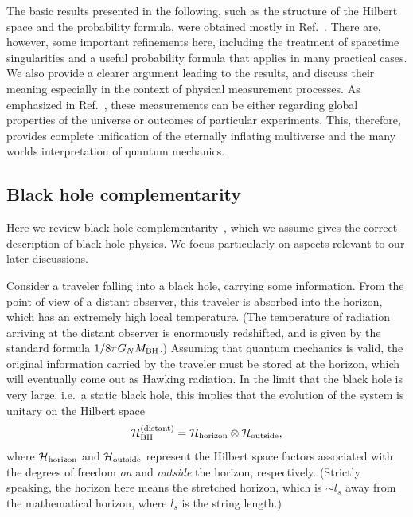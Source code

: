 \documentclass[12pt]{article}
\begin{document}
The basic results presented in the following, such as the structure 
of the Hilbert space and the probability formula, were obtained mostly 
in Ref.~\cite{Nomura:2011dt}.  There are, however, some important 
refinements here, including the treatment of spacetime singularities 
and a useful probability formula that applies in many practical cases. 
We also provide a clearer argument leading to the results, and discuss 
their meaning especially in the context of physical measurement processes. 
As emphasized in Ref.~\cite{Nomura:2011dt}, these measurements can 
be either regarding global properties of the universe or outcomes of 
particular experiments.  This, therefore, provides complete unification 
of the eternally inflating multiverse and the many worlds interpretation 
of quantum mechanics.


\subsection{Black hole complementarity}
\label{subsec:BH-compl}

Here we review black hole 
complementarity~\cite{Susskind:1993if,Susskind:2005js}, which we assume 
gives the correct description of black hole physics.  We focus particularly 
on aspects relevant to our later discussions.

Consider a traveler falling into a black hole, carrying some information. 
From the point of view of a distant observer, this traveler is absorbed 
into the horizon, which has an extremely high local temperature.  (The 
temperature of radiation arriving at the distant observer is enormously 
redshifted, and is given by the standard formula $1/8\pi G_N M_{\rm BH}$.) 
Assuming that quantum mechanics is valid, the original information carried 
by the traveler must be stored at the horizon, which will eventually come 
out as Hawking radiation.  In the limit that the black hole is very large, 
i.e.\ a static black hole, this implies that the evolution of the system 
is unitary on the Hilbert space
%
\begin{equation}
  {\cal H}_{\rm BH}^{\rm (distant)} = 
  {\cal H}_{\rm horizon} \otimes {\cal H}_{\rm outside},
\label{eq:H-distant}
\end{equation}
%
where ${\cal H}_{\rm horizon}$ and ${\cal H}_{\rm outside}$ represent the 
Hilbert space factors associated with the degrees of freedom {\it on} and 
{\it outside} the horizon, respectively.  (Strictly speaking, the horizon 
here means the stretched horizon, which is $\sim l_s$ away from the 
mathematical horizon, where $l_s$ is the string length.)
\end{document}
